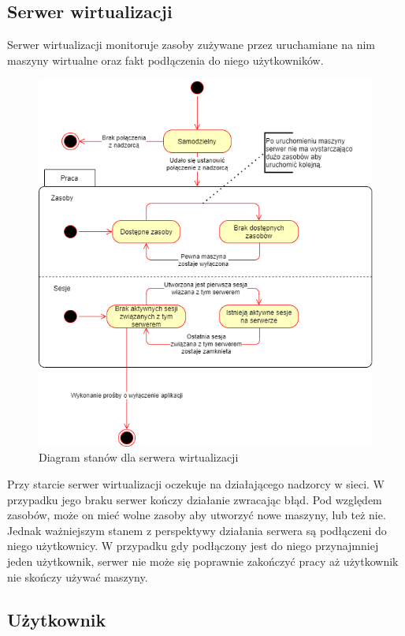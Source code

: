 \documentclass[../opis-rozwiazania.tex]{subfiles}
\begin{document}
\subsection{Serwer wirtualizacji}

Serwer wirtualizacji monitoruje zasoby zużywane przez uruchamiane na nim maszyny wirtualne oraz fakt podłączenia do niego użytkowników.

\begin{figure}[H]
  \centering
  \includegraphics[width=\textwidth]{../diagrams/state_diagrams/virtualisation_server.png}
  \caption{Diagram stanów dla serwera wirtualizacji}
  \label{state_virtsrv}
\end{figure}

Przy starcie serwer wirtualizacji oczekuje na działającego nadzorcy w sieci.
W przypadku jego braku serwer kończy działanie zwracając błąd.
Pod względem zasobów, może on mieć wolne zasoby aby utworzyć nowe maszyny, lub też nie.
Jednak ważniejszym stanem z perspektywy działania serwera są podłączeni do niego użytkownicy.
W przypadku gdy podłączony jest do niego przynajmniej jeden użytkownik, serwer nie może się poprawnie zakończyć pracy aż użytkownik nie skończy używać maszyny.

\subsection{Użytkownik}
\end{document}
